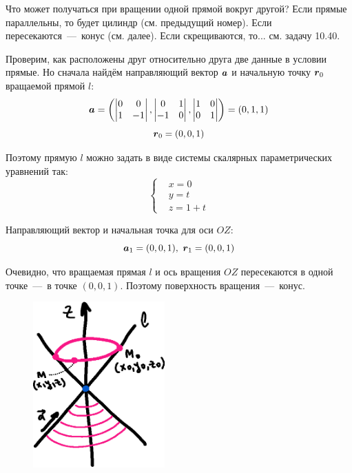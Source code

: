\documentclass[a4paper,12pt]{article}
\begin{document}
  \begin{solution}
    Что может получаться при вращении одной прямой вокруг другой?
    Если прямые параллельны, то будет цилиндр (см. предыдущий номер).
    Если пересекаются~---~конус (см. далее). %
    Если скрещиваются, то... см. задачу 10.40.
    
    Проверим, как расположены друг относительно друга две данные в условии прямые.
    Но сначала найдём направляющий вектор $\boldsymbol a$ и начальную точку $\boldsymbol r_0$ вращаемой прямой $l$:
    \[
      \boldsymbol a = \left(\begin{vmatrix}0 & 0\\ 1 & -1\end{vmatrix}, \begin{vmatrix}0 & 1\\ -1 & 0\end{vmatrix}, \begin{vmatrix}1 & 0\\ 0 & 1\end{vmatrix}\right)
      = (0, 1, 1)
    \]
    \[
      \boldsymbol r_0 = (0, 0, 1)
    \]
    
    Поэтому прямую $l$ можно задать в виде системы скалярных параметрических уравнений так:
    \[
      \left\{
        \begin{aligned}
          &x = 0\\
          &y = t\\
          &z = 1 + t
        \end{aligned}
      \right.
    \]
    
    Направляющий вектор и начальная точка для оси $OZ$:
    \[
      \boldsymbol a_1 = (0, 0, 1),\ \boldsymbol r_1 = (0, 0, 1)
    \]
    
    Очевидно, что вращаемая прямая $l$ и ось вращения $OZ$ пересекаются в одной точке~---~в точке $(0, 0, 1)$.
    Поэтому поверхность вращения~---~конус.
    
    \begin{figure}[h]
      \centering

      \includegraphics[width=0.45\textwidth]{conic-10-41}
    

\end{figure}
\end{solution}
\end{document}
